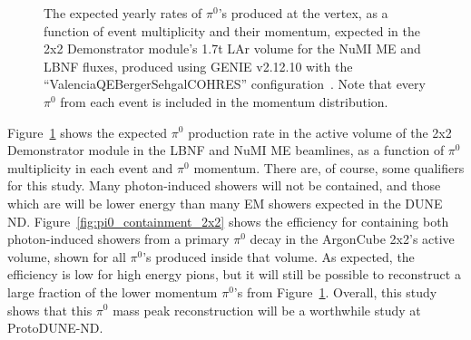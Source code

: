 \begin{figure}[htb]
  \centering
  \caption{The expected yearly rates of $\pi^{0}$'s produced at the vertex, as a function of event multiplicity and their momentum, expected in the 2x2 Demonstrator module's 1.7t LAr volume for the NuMI ME and LBNF fluxes, produced using GENIE v2.12.10 with the ``ValenciaQEBergerSehgalCOHRES'' configuration~\cite{genie}. Note that every $\pi^{0}$ from each event is included in the momentum distribution.}
  \label{fig:pi0_kinematics}
\end{figure}
Figure~\ref{fig:pi0_kinematics} shows the expected $\pi^{0}$ production rate in the active volume of the 2x2 Demonstrator module in the LBNF and NuMI ME beamlines, as a function of $\pi^{0}$ multiplicity in each event and $\pi^{0}$ momentum. There are, of course, some qualifiers for this study. Many photon-induced showers will not be contained, and those which are will be lower energy than many EM showers expected in the DUNE ND. Figure~\ref{fig:pi0_containment_2x2} shows the efficiency for containing both photon-induced showers from a primary $\pi^{0}$ decay in the ArgonCube 2x2's active volume, shown for all $\pi^{0}$'s produced inside that volume. As expected, the efficiency is low for high energy pions, but it will still be possible to reconstruct a large fraction of the lower momentum $\pi^{0}$'s from Figure~\ref{fig:pi0_kinematics}. Overall, this study shows that this $\pi^{0}$ mass peak reconstruction will be a worthwhile study at ProtoDUNE-ND.

